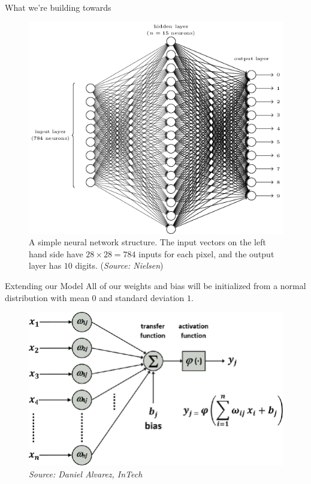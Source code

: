 \documentclass[xcolor=dvipsnames, fontsize=11pt, %
pagesize, %
parskip=half-, t]{beamer}
\begin{document}
\begin{frame}{What we're building towards}
\begin{figure}
\center
\includegraphics[scale=0.36]{goal.png}
\caption{A simple neural network structure. The input vectors on the left hand side have $28\times 28=784$ inputs for each pixel, and the output layer has $10$ digits. (\textit{Source: Nielsen}) }
\end{figure}
\end{frame}

\begin{frame}{Extending our Model}
All of our weights and bias will be initialized from a normal distribution with mean $0$ and standard deviation $1$. 
\begin{figure}
\center
\includegraphics[scale=0.28]{perceptron.png}
\caption{\textit{Source: Daniel Alvarez, InTech}}
\end{figure}
\end{frame}
\end{document}
